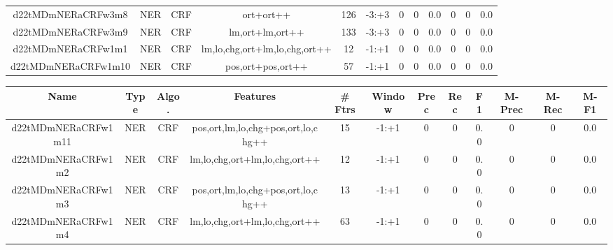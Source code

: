 \documentclass[a4paper]{article}
\begin{document}
\begin{landscape}
\begin{center}
\begin{tabular}{ |c|c|c|c|c|c|c|c|c|c|c|c|}
 
 	
 	\small{ d22tMDmNERaCRFw3m8 } & \small{ NER} & \small{  CRF }  & ort+ort++  &  126 &  \small{  -3:+3 }  &  0 & 0 & 0.0  &  0 & 0 & 0.0 \\
 	

 
 	
 	\small{ d22tMDmNERaCRFw3m9 } & \small{ NER} & \small{  CRF }  & lm,ort+lm,ort++  &  133 &  \small{  -3:+3 }  &  0 & 0 & 0.0  &  0 & 0 & 0.0 \\
 	

 
 	
 	\small{ d22tMDmNERaCRFw1m1 } & \small{ NER} & \small{  CRF }  & lm,lo,chg,ort+lm,lo,chg,ort++  &  12 &  \small{  -1:+1 }  &  0 & 0 & 0.0  &  0 & 0 & 0.0 \\
 	

 
 	
 	\small{ d22tMDmNERaCRFw1m10 } & \small{ NER} & \small{  CRF }  & pos,ort+pos,ort++  &  57 &  \small{  -1:+1 }  &  0 & 0 & 0.0  &  0 & 0 & 0.0 \\
 	
 \hline
\end{tabular}
\end{center}




\begin{center}
\begin{tabular}{ |c|c|c|c|c|c|c|c|c|c|c|c|} 
 \hline
 	Name & Type & Algo. & Features & \# Ftrs & Window & Prec & Rec & F1 & M-Prec & M-Rec & M-F1\\
 \hline

 	

 
 	
 	\small{ d22tMDmNERaCRFw1m11 } & \small{ NER} & \small{  CRF }  & pos,ort,lm,lo,chg+pos,ort,lo,chg++  &  15 &  \small{  -1:+1 }  &  0 & 0 & 0.0  &  0 & 0 & 0.0 \\
 	

 
 	
 	\small{ d22tMDmNERaCRFw1m2 } & \small{ NER} & \small{  CRF }  & lm,lo,chg,ort+lm,lo,chg,ort++  &  12 &  \small{  -1:+1 }  &  0 & 0 & 0.0  &  0 & 0 & 0.0 \\
 	

 
 	
 	\small{ d22tMDmNERaCRFw1m3 } & \small{ NER} & \small{  CRF }  & pos,ort,lm,lo,chg+pos,ort,lo,chg++  &  13 &  \small{  -1:+1 }  &  0 & 0 & 0.0  &  0 & 0 & 0.0 \\
 	

 
 	
 	\small{ d22tMDmNERaCRFw1m4 } & \small{ NER} & \small{  CRF }  & lm,lo,chg,ort+lm,lo,chg,ort++  &  63 &  \small{  -1:+1 }  &  0 & 0 & 0.0  &  0 & 0 & 0.0 \\
 	


\end{tabular}
\end{center}
\end{landscape}
\end{document}
